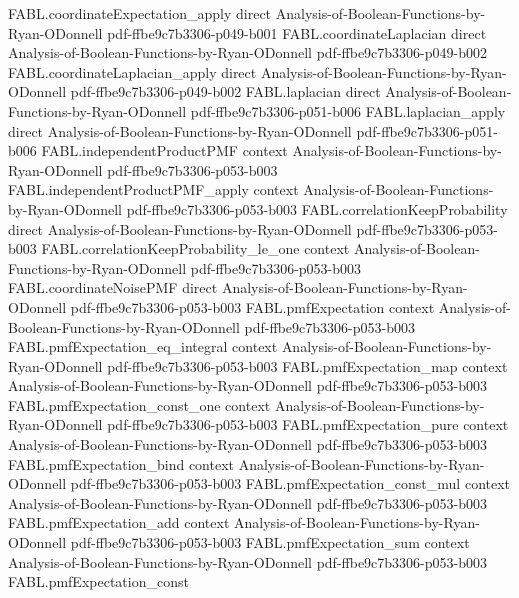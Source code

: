 \begin{theorem}
  {FABL.coordinateExpectation_apply}
  {direct}
  {Analysis-of-Boolean-Functions-by-Ryan-ODonnell}
  {pdf-ffbe9c7b3306-p049-b001}
\proofstep
  {FABL.coordinateLaplacian}
  {direct}
  {Analysis-of-Boolean-Functions-by-Ryan-ODonnell}
  {pdf-ffbe9c7b3306-p049-b002}
\proofstep
  {FABL.coordinateLaplacian_apply}
  {direct}
  {Analysis-of-Boolean-Functions-by-Ryan-ODonnell}
  {pdf-ffbe9c7b3306-p049-b002}
\proofstep
  {FABL.laplacian}
  {direct}
  {Analysis-of-Boolean-Functions-by-Ryan-ODonnell}
  {pdf-ffbe9c7b3306-p051-b006}
\proofstep
  {FABL.laplacian_apply}
  {direct}
  {Analysis-of-Boolean-Functions-by-Ryan-ODonnell}
  {pdf-ffbe9c7b3306-p051-b006}
\proofstep
  {FABL.independentProductPMF}
  {context}
  {Analysis-of-Boolean-Functions-by-Ryan-ODonnell}
  {pdf-ffbe9c7b3306-p053-b003}
\proofstep
  {FABL.independentProductPMF_apply}
  {context}
  {Analysis-of-Boolean-Functions-by-Ryan-ODonnell}
  {pdf-ffbe9c7b3306-p053-b003}
\proofstep
  {FABL.correlationKeepProbability}
  {direct}
  {Analysis-of-Boolean-Functions-by-Ryan-ODonnell}
  {pdf-ffbe9c7b3306-p053-b003}
\proofstep
  {FABL.correlationKeepProbability_le_one}
  {context}
  {Analysis-of-Boolean-Functions-by-Ryan-ODonnell}
  {pdf-ffbe9c7b3306-p053-b003}
\proofstep
  {FABL.coordinateNoisePMF}
  {direct}
  {Analysis-of-Boolean-Functions-by-Ryan-ODonnell}
  {pdf-ffbe9c7b3306-p053-b003}
\proofstep
  {FABL.pmfExpectation}
  {context}
  {Analysis-of-Boolean-Functions-by-Ryan-ODonnell}
  {pdf-ffbe9c7b3306-p053-b003}
\proofstep
  {FABL.pmfExpectation_eq_integral}
  {context}
  {Analysis-of-Boolean-Functions-by-Ryan-ODonnell}
  {pdf-ffbe9c7b3306-p053-b003}
\proofstep
  {FABL.pmfExpectation_map}
  {context}
  {Analysis-of-Boolean-Functions-by-Ryan-ODonnell}
  {pdf-ffbe9c7b3306-p053-b003}
\proofstep
  {FABL.pmfExpectation_const_one}
  {context}
  {Analysis-of-Boolean-Functions-by-Ryan-ODonnell}
  {pdf-ffbe9c7b3306-p053-b003}
\proofstep
  {FABL.pmfExpectation_pure}
  {context}
  {Analysis-of-Boolean-Functions-by-Ryan-ODonnell}
  {pdf-ffbe9c7b3306-p053-b003}
\proofstep
  {FABL.pmfExpectation_bind}
  {context}
  {Analysis-of-Boolean-Functions-by-Ryan-ODonnell}
  {pdf-ffbe9c7b3306-p053-b003}
\proofstep
  {FABL.pmfExpectation_const_mul}
  {context}
  {Analysis-of-Boolean-Functions-by-Ryan-ODonnell}
  {pdf-ffbe9c7b3306-p053-b003}
\proofstep
  {FABL.pmfExpectation_add}
  {context}
  {Analysis-of-Boolean-Functions-by-Ryan-ODonnell}
  {pdf-ffbe9c7b3306-p053-b003}
\proofstep
  {FABL.pmfExpectation_sum}
  {context}
  {Analysis-of-Boolean-Functions-by-Ryan-ODonnell}
  {pdf-ffbe9c7b3306-p053-b003}
\proofstep
  {FABL.pmfExpectation_const}

\end{theorem}
